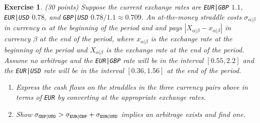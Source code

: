 \documentclass[11pt,fleqn]{amsproc}
\newtheorem{xca}{Exercise}
\begin{document}
\begin{xca}{(30 points)}
Suppose the current exchange rates are {\small\tt EUR|GBP} $1.1$, {\small\tt EUR|USD} $0.78$, and 
{\small\tt GBP|USD} $0.78/1.1 \approx 0.709$. An at-the-money
straddle costs $\sigma_{\alpha|\beta}$ in currency $\alpha$ at the beginning of the period and
and pays $|X_{\alpha|\beta} - x_{\alpha|\beta}|$ in currency $\beta$ at the end of the period,
where $x_{\alpha|\beta}$ is the exchange rate at the beginning of the period and $X_{\alpha|\beta}$
is the exchange rate at the end of the period. Assume no arbitrage and the {\small\tt EUR|GBP} rate will be
in the interval $[0.55, 2.2]$ and the {\small\tt EUR|USD} rate will be in the interval $[0.36, 1.56]$ at the
end of the period. 
\begin{enumerate}
\item Express the cash flows on the straddles in the three currency pairs above in terms of {\small\tt EUR} by converting at the
appropriate exchange rates.
\item Show $\sigma_{\tt GBP|USD} > \sigma_{\tt EUR|GBP} + \sigma_{\tt EUR|USD}$ implies an arbitrage
exists and find one.
\end{enumerate}
\end{xca}
\end{document}
